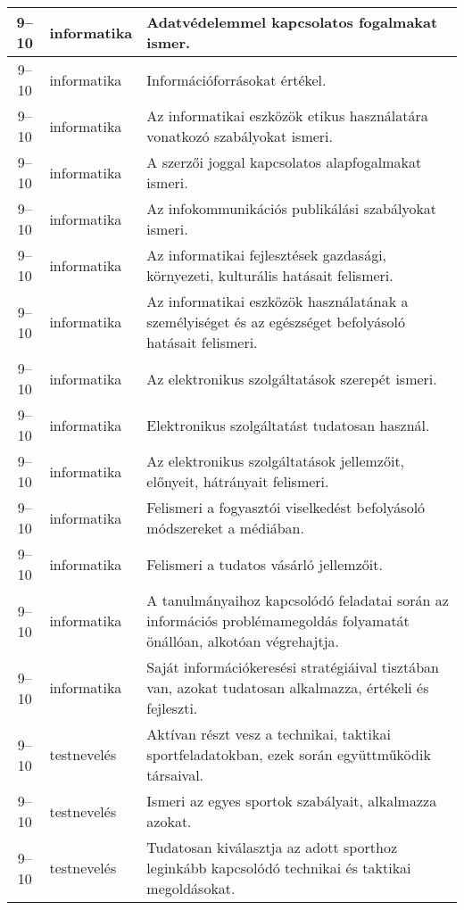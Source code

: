 \begin{small}
\begin{longtable}{c | p{2cm} |  p{11cm} }
              9--10 & informatika & Adatvédelemmel kapcsolatos fogalmakat ismer. \\ \hline
              9--10 & informatika & Információforrásokat értékel. \\ \hline
              9--10 & informatika & Az informatikai eszközök etikus használatára vonatkozó szabályokat ismeri. \\ \hline
              9--10 & informatika & A szerzői joggal kapcsolatos alapfogalmakat ismeri. \\ \hline
              9--10 & informatika & Az infokommunikációs publikálási szabályokat ismeri. \\ \hline
              9--10 & informatika & Az informatikai fejlesztések gazdasági, környezeti, kulturális hatásait felismeri. \\ \hline
              9--10 & informatika & Az informatikai eszközök használatának a személyiséget és az egészséget befolyásoló hatásait felismeri. \\ \hline
              9--10 & informatika & Az elektronikus szolgáltatások szerepét ismeri. \\ \hline
              9--10 & informatika & Elektronikus szolgáltatást tudatosan használ. \\ \hline
              9--10 & informatika & Az elektronikus szolgáltatások jellemzőit, előnyeit, hátrányait felismeri. \\ \hline
              9--10 & informatika & Felismeri a fogyasztói viselkedést befolyásoló módszereket a médiá\-ban. \\ \hline
              9--10 & informatika & Felismeri a tudatos vásárló jellemzőit. \\ \hline
              9--10 & informatika & A tanulmányaihoz kapcsolódó feladatai során az információs problémamegoldás folyamatát önállóan, alkotóan végrehajtja. \\ \hline
              9--10 & informatika & Saját információkeresési stratégiáival tisztában van, azokat tudatosan alkalmazza, értékeli és fejleszti. \\ \hline
              9--10 & testnevelés & Aktívan részt vesz a technikai, taktikai sportfeladatokban, ezek során együttműködik társaival. \\ \hline
              9--10 & testnevelés & Ismeri az egyes sportok szabályait, alkalmazza azokat. \\ \hline
              9--10 & testnevelés & Tudatosan kiválasztja az adott sporthoz leginkább kapcsolódó technikai és taktikai megoldásokat. \\ \hline

\end{longtable}
\end{small}

